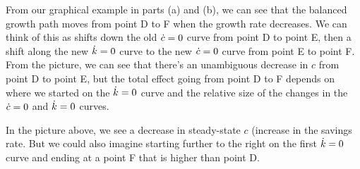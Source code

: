 \documentclass[12pt]{article}
\begin{document}
From our graphical example in parts (a) and (b), we can see that the balanced growth path moves from point D to F when the growth rate decreases. We can think of this as shifts down the old $\dot c=0$ curve from point D to point E, then a shift along the new $\dot k=0$ curve to the new $\dot c=0$ curve from point E to point F. From the picture, we can see that there's an unambiguous decrease in $c$ from point D to point E, but the total effect going from point D to F depends on where we started on the $\dot k=0$ curve and the relative size of the changes in the $\dot c=0$ and $\dot k=0$ curves.

In the picture above, we see a decrease in steady-state $c$ (increase in the savings rate. But we could also imagine starting further to the right on the first $\dot k=0$ curve and ending at a point F that is higher than point D.

\newpage{}
\end{document}

